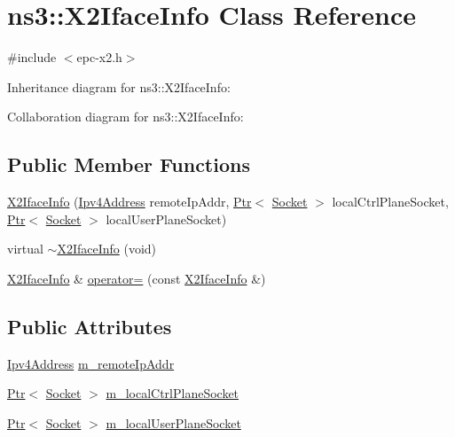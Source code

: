 \hypertarget{classns3_1_1X2IfaceInfo}{}\section{ns3\+:\+:X2\+Iface\+Info Class Reference}
\label{classns3_1_1X2IfaceInfo}


{\ttfamily \#include $<$epc-\/x2.\+h$>$}



Inheritance diagram for ns3\+:\+:X2\+Iface\+Info\+:


Collaboration diagram for ns3\+:\+:X2\+Iface\+Info\+:
\subsection*{Public Member Functions}
\begin{DoxyCompactItemize}
\item 
\hyperlink{classns3_1_1X2IfaceInfo_ab5fd067d9aeccb2bb1c3ae5c66fbc40f}{X2\+Iface\+Info} (\hyperlink{classns3_1_1Ipv4Address}{Ipv4\+Address} remote\+Ip\+Addr, \hyperlink{classns3_1_1Ptr}{Ptr}$<$ \hyperlink{classns3_1_1Socket}{Socket} $>$ local\+Ctrl\+Plane\+Socket, \hyperlink{classns3_1_1Ptr}{Ptr}$<$ \hyperlink{classns3_1_1Socket}{Socket} $>$ local\+User\+Plane\+Socket)
\item 
virtual \hyperlink{classns3_1_1X2IfaceInfo_a7e3aea37ada294f552ee2cb68701b824}{$\sim$\+X2\+Iface\+Info} (void)
\item 
\hyperlink{classns3_1_1X2IfaceInfo}{X2\+Iface\+Info} \& \hyperlink{classns3_1_1X2IfaceInfo_a7cb56db79e3874d3c06fefaee45cb0b7}{operator=} (const \hyperlink{classns3_1_1X2IfaceInfo}{X2\+Iface\+Info} \&)
\end{DoxyCompactItemize}
\subsection*{Public Attributes}
\begin{DoxyCompactItemize}
\item 
\hyperlink{classns3_1_1Ipv4Address}{Ipv4\+Address} \hyperlink{classns3_1_1X2IfaceInfo_a3b170ed7c2db07acb2a66ced1ea84453}{m\+\_\+remote\+Ip\+Addr}
\item 
\hyperlink{classns3_1_1Ptr}{Ptr}$<$ \hyperlink{classns3_1_1Socket}{Socket} $>$ \hyperlink{classns3_1_1X2IfaceInfo_a2ae45b9d509ee8f3d3ba049eacf89b8c}{m\+\_\+local\+Ctrl\+Plane\+Socket}
\item 
\hyperlink{classns3_1_1Ptr}{Ptr}$<$ \hyperlink{classns3_1_1Socket}{Socket} $>$ \hyperlink{classns3_1_1X2IfaceInfo_aed8c37f6d0ee6907fe0a755b72f47f7e}{m\+\_\+local\+User\+Plane\+Socket}
\end{DoxyCompactItemize}
